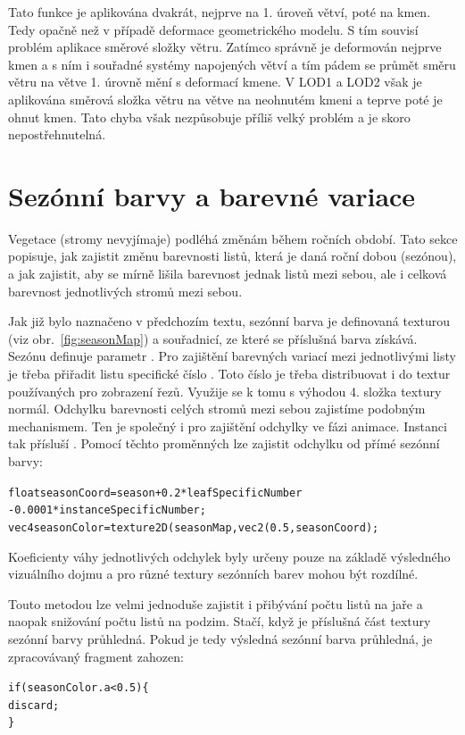 Tato funkce je aplikována dvakrát, nejprve na 1. úroveň větví, poté na kmen. Tedy opačně než v případě deformace geometrického modelu. S tím souvisí problém aplikace směrové složky větru. Zatímco správně je deformován nejprve kmen a s ním i souřadné systémy napojených větví a tím pádem se průmět směru větru na větve 1. úrovně mění s deformací kmene. V LOD1 a LOD2 však je aplikována směrová složka větru na větve na neohnutém kmeni a teprve poté je ohnut kmen. Tato chyba však nezpůsobuje příliš velký problém a je skoro nepostřehnutelná.

%
\section{Sezónní barvy a barevné variace}
Vegetace (stromy nevyjímaje) podléhá změnám během ročních období. Tato sekce popisuje, jak zajistit změnu barevnosti listů, která je daná roční dobou (sezónou), a jak zajistit, aby se mírně lišila barevnost jednak listů mezi sebou, ale i celková barevnost jednotlivých stromů mezi sebou. 

Jak již bylo naznačeno v předchozím textu, sezónní barva je definovaná texturou (viz obr.~\ref{fig:seasonMap}) a souřadnicí, ze které se příslušná barva získává. Sezónu definuje parametr . Pro zajištění barevných variací mezi jednotlivými listy je třeba přiřadit listu specifické číslo . Toto číslo je třeba distribuovat i do textur používaných pro zobrazení řezů. Využije se k tomu s výhodou 4. složka textury normál. Odchylku barevnosti celých stromů mezi sebou zajistíme podobným mechanismem. Ten je společný i pro zajištění odchylky ve fázi animace. Instanci tak přísluší . Pomocí těchto proměnných lze zajistit odchylku od přímé sezónní barvy:
\begin{alltt}
float seasonCoord = season + 0.2*leafSpecificNumber
                                             - 0.0001*instanceSpecificNumber;
vec4  seasonColor = texture2D(seasonMap, vec2(0.5, seasonCoord);
\end{alltt}
Koeficienty váhy jednotlivých odchylek byly určeny pouze na základě výsledného vizuálního dojmu a pro různé textury sezónních barev mohou být rozdílné.

Touto metodou lze velmi jednoduše zajistit i přibývání počtu listů na jaře a naopak snižování počtu listů na podzim. Stačí, když je příslušná část textury sezónní barvy průhledná. Pokud je tedy výsledná sezónní barva průhledná, je zpracovávaný fragment zahozen:
\begin{alltt}
  if ( seasonColor.a < 0.5 )\{
     discard;
  \}
\end{alltt}

